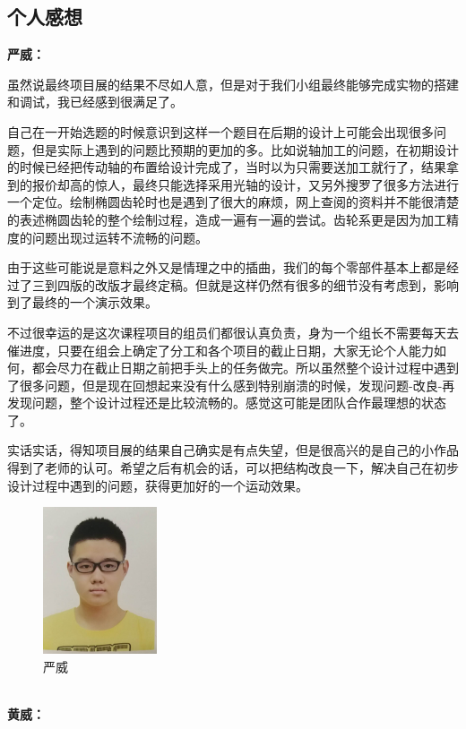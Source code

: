 \documentclass[12pt]{article}
\begin{document}
\begin{CJK}{UTF8}{song}
\subsection{个人感想}
\textbf{严威：}\par
 
虽然说最终项目展的结果不尽如人意，但是对于我们小组最终能够完成实物的搭建和调试，我已经感到很满足了。\par
自己在一开始选题的时候意识到这样一个题目在后期的设计上可能会出现很多问题，但是实际上遇到的问题比预期的更加的多。比如说轴加工的问题，在初期设计的时候已经把传动轴的布置给设计完成了，当时以为只需要送加工就行了，结果拿到的报价却高的惊人，最终只能选择采用光轴的设计，又另外搜罗了很多方法进行一个定位。绘制椭圆齿轮时也是遇到了很大的麻烦，网上查阅的资料并不能很清楚的表述椭圆齿轮的整个绘制过程，造成一遍有一遍的尝试。齿轮系更是因为加工精度的问题出现过运转不流畅的问题。\par
由于这些可能说是意料之外又是情理之中的插曲，我们的每个零部件基本上都是经过了三到四版的改版才最终定稿。但就是这样仍然有很多的细节没有考虑到，影响到了最终的一个演示效果。\par
不过很幸运的是这次课程项目的组员们都很认真负责，身为一个组长不需要每天去催进度，只要在组会上确定了分工和各个项目的截止日期，大家无论个人能力如何，都会尽力在截止日期之前把手头上的任务做完。所以虽然整个设计过程中遇到了很多问题，但是现在回想起来没有什么感到特别崩溃的时候，发现问题-改良-再发现问题，整个设计过程还是比较流畅的。感觉这可能是团队合作最理想的状态了。\par
实话实话，得知项目展的结果自己确实是有点失望，但是很高兴的是自己的小作品得到了老师的认可。希望之后有机会的话，可以把结构改良一下，解决自己在初步设计过程中遇到的问题，获得更加好的一个运动效果。
\begin{figure}[H]
\centering
\includegraphics[width=0.3\textwidth]{photo//yw.jpg}
\caption{严威}
\end{figure}
~\\
\textbf{黄威：}\par


\end{CJK}
\end{document}

